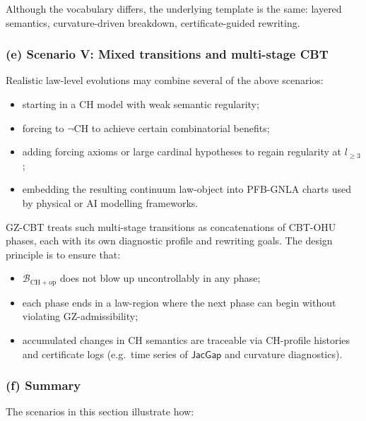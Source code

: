 \documentclass[11pt]{book}
\theoremstyle{plain}
\theoremstyle{definition}
\begin{document}
Although the vocabulary differs, the underlying template is the same:
layered semantics, curvature-driven breakdown, certificate-guided
rewriting.



\subsubsection*{(e) Scenario V: Mixed transitions and multi-stage CBT}

Realistic law-level evolutions may combine several of the above
scenarios:

\begin{itemize}
  \item starting in a CH model with weak semantic regularity;
  \item forcing to $\neg\mathrm{CH}$ to achieve certain combinatorial
        benefits;
  \item adding forcing axioms or large cardinal hypotheses to regain
        regularity at $l_{\ge3}$;
  \item embedding the resulting continuum law-object into PFB-GNLA
        charts used by physical or AI modelling frameworks.
\end{itemize}

GZ-CBT treats such multi-stage transitions as concatenations of
CBT-OHU phases, each with its own diagnostic profile and rewriting
goals. The design principle is to ensure that:

\begin{itemize}
  \item $\mathcal{B}_{\mathrm{CH+op}}$ does not blow up uncontrollably
        in any phase;
  \item each phase ends in a law-region where the next phase can begin
        without violating GZ-admissibility;
  \item accumulated changes in CH semantics are traceable via
        CH-profile histories and certificate logs (e.g.\ time series
        of $\mathsf{JacGap}$ and curvature diagnostics).
\end{itemize}



\subsubsection*{(f) Summary}

The scenarios in this section illustrate how:
\end{document}
